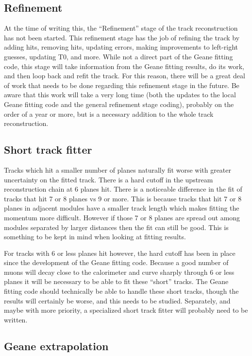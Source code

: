 	\subsection{Refinement}

		At the time of writing this, the ``Refinement'' stage of the track reconstruction has not been started. This refinement stage has the job of refining the track by adding hits, removing hits, updating errors, making improvements to left-right guesses, updating T0, and more. While not a direct part of the Geane fitting code, this stage will take information from the Geane fitting results, do its work, and then loop back and refit the track. For this reason, there will be a great deal of work that needs to be done regarding this refinement stage in the future. Be aware that this work will take a very long time (both the updates to the local Geane fitting code and the general refinement stage coding), probably on the order of a year or more, but is a necessary addition to the whole track reconstruction.

	\subsection{Short track fitter}

		Tracks which hit a smaller number of planes naturally fit worse with greater uncertainty on the fitted track. There is a hard cutoff in the upstream reconstruction chain at 6 planes hit. There is a noticeable difference in the fit of tracks that hit 7 or 8 planes vs 9 or more. This is because tracks that hit 7 or 8 planes in adjacent modules have a smaller track length which makes fitting the momentum more difficult. However if those 7 or 8 planes are spread out among modules separated by larger distances then the fit can still be good. This is something to be kept in mind when looking at fitting results.

		For tracks with 6 or less planes hit however, the hard cutoff has been in place since the development of the Geane fitting code. Because a good number of muons will decay close to the calorimeter and curve sharply through 6 or less planes it will be necessary to be able to fit these ``short'' tracks. The Geane fitting code should technically be able to handle these short tracks, though the results will certainly be worse, and this needs to be studied. Separately, and maybe with more priority, a specialized short track fitter will probably need to be written.

	\subsection{Geane extrapolation}

